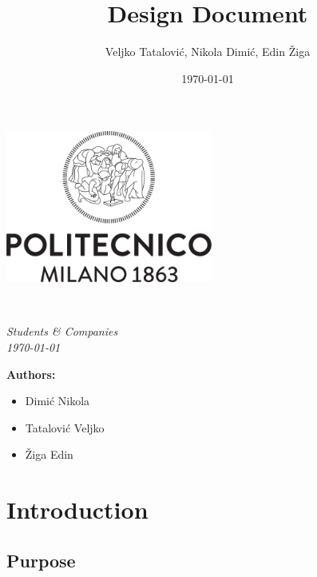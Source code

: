 \documentclass[a4paper,oneside,11pt]{article}
\title{Design Document}
\author{Veljko Tatalović, Nikola Dimić, Edin Žiga}
\date{\today}
\begin{document}
    \begin{titlingpage} 
        \begin{center}
            \includegraphics[height=5cm]{./RASD-Latex/assets/Logo_Politecnico_Milano.png}\\
            \vspace{4cm}
            \begin{huge} 
                \textbf{\thetitle} \\
            \end{huge}
            \vspace{0.3cm}
            \begin{Large}
                \textit{Students \& Companies} \\
                \vspace{0.3cm}
                \textit{\today}
            \end{Large}
        \end{center}

            \vspace{4cm}
             \begin{large}
            \textbf{Authors:}
            \begin{itemize}
                \item Dimić Nikola
                \item Tatalović Veljko 
                \item Žiga Edin
            \end{itemize}
        \end{large}
    \end{titlingpage}
    \newpage
    \tableofcontents
    \newpage
        
    \section{Introduction}
        \subsection{Purpose}
            
\end{document}
